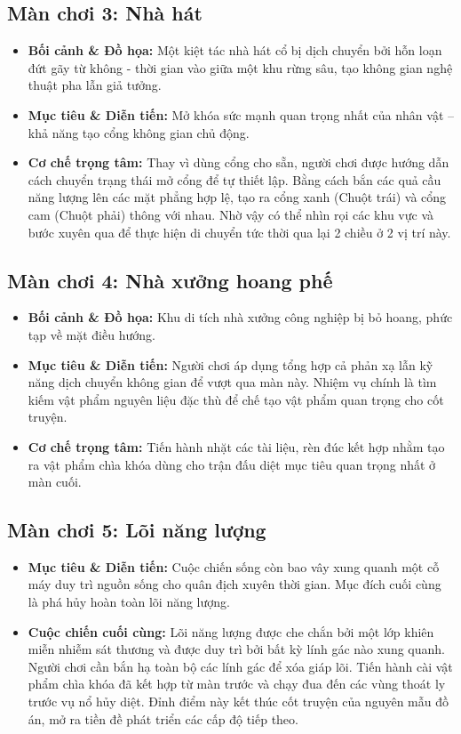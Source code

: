 \documentclass[../DoAn.tex]{subfiles}
\begin{document}
\subsection{Màn chơi 3: Nhà hát}
\begin{itemize}
    \item \textbf{Bối cảnh \& Đồ họa:} Một kiệt tác nhà hát cổ bị dịch chuyển bởi hỗn loạn đứt gãy từ không - thời gian vào giữa một khu rừng sâu, tạo không gian nghệ thuật pha lẫn giả tưởng.
    \item \textbf{Mục tiêu \& Diễn tiến:} Mở khóa sức mạnh quan trọng nhất của nhân vật -- khả năng tạo cổng không gian chủ động. 
    \item \textbf{Cơ chế trọng tâm:} Thay vì dùng cổng cho sẵn, người chơi được hướng dẫn cách chuyển trạng thái mở cổng để tự thiết lập. Bằng cách bắn các quả cầu năng lượng lên các mặt phẳng hợp lệ, tạo ra cổng xanh (Chuột trái) và cổng cam (Chuột phải) thông với nhau. Nhờ vậy có thể nhìn rọi các khu vực và bước xuyên qua để thực hiện di chuyển tức thời qua lại 2 chiều ở 2 vị trí này.
\end{itemize}

\subsection{Màn chơi 4: Nhà xưởng hoang phế}
\begin{itemize}
    \item \textbf{Bối cảnh \& Đồ họa:} Khu di tích nhà xưởng công nghiệp bị bỏ hoang, phức tạp về mặt điều hướng.
    \item \textbf{Mục tiêu \& Diễn tiến:} Người chơi áp dụng tổng hợp cả phản xạ lẫn kỹ năng dịch chuyển không gian để vượt qua màn này. Nhiệm vụ chính là tìm kiếm vật phẩm nguyên liệu đặc thù để chế tạo vật phẩm quan trọng cho cốt truyện.
    \item \textbf{Cơ chế trọng tâm:} Tiến hành nhặt các tài liệu, rèn đúc kết hợp nhằm tạo ra vật phẩm chìa khóa dùng cho trận đấu diệt mục tiêu quan trọng nhất ở màn cuối.
\end{itemize}

\subsection{Màn chơi 5: Lõi năng lượng}
\begin{itemize}
    \item \textbf{Mục tiêu \& Diễn tiến:} Cuộc chiến sống còn bao vây xung quanh một cỗ máy duy trì nguồn sống cho quân địch xuyên thời gian. Mục đích cuối cùng là phá hủy hoàn toàn lõi năng lượng.
    \item \textbf{Cuộc chiến cuối cùng:} Lõi năng lượng được che chắn bởi một lớp khiên miễn nhiễm sát thương và được duy trì bởi bất kỳ lính gác nào xung quanh. Người chơi cần bắn hạ toàn bộ các lính gác để xóa giáp lõi. Tiến hành cài vật phẩm chìa khóa đã kết hợp từ màn trước và chạy đua đến các vùng thoát ly trước vụ nổ hủy diệt. Đỉnh điểm này kết thúc cốt truyện của nguyên mẫu đồ án, mở ra tiền đề phát triển các cấp độ tiếp theo.
\end{itemize}
\end{document}
